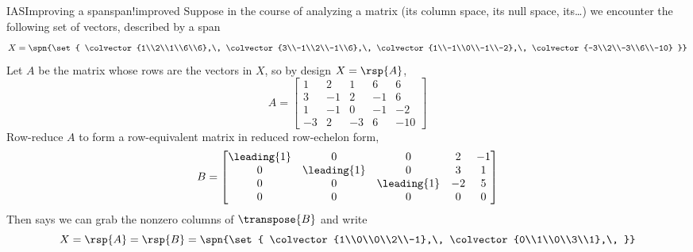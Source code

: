 \begin{example}{IAS}{Improving a span}{span!improved}
Suppose in the course of analyzing a matrix (its column space, its null space, its\dots) we encounter the following set of vectors, described by a span
%
\begin{equation*}
X=\spn{\set{
\colvector{1\\2\\1\\6\\6},\,
\colvector{3\\-1\\2\\-1\\6},\,
\colvector{1\\-1\\0\\-1\\-2},\,
\colvector{-3\\2\\-3\\6\\-10}
}}
\end{equation*}
%
Let $A$ be the matrix whose rows are the vectors in $X$, so by design $X=\rsp{A}$,
%
\begin{equation*}
A=
\begin{bmatrix}
1 & 2 & 1 & 6 & 6\\
3 & -1 & 2 & -1 & 6\\
1 & -1 & 0 & -1 & -2\\
-3 & 2 & -3 & 6 & -10
\end{bmatrix}
\end{equation*}
%
Row-reduce $A$ to form a row-equivalent matrix in reduced row-echelon form,
%
\begin{equation*}
B=
\begin{bmatrix}
\leading{1} & 0 & 0 & 2 & -1\\
0 & \leading{1} & 0 & 3 & 1\\
0 & 0 & \leading{1} & -2 & 5\\
0 & 0 & 0 & 0 & 0
\end{bmatrix}
\end{equation*}
%
Then  says we can grab the nonzero columns of $\transpose{B}$ and write
%
\begin{equation*}
X=\rsp{A}=\rsp{B}=
\spn{\set{
\colvector{1\\0\\0\\2\\-1},\,
\colvector{0\\1\\0\\3\\1},\,
}}
\end{equation*}
\end{example}
